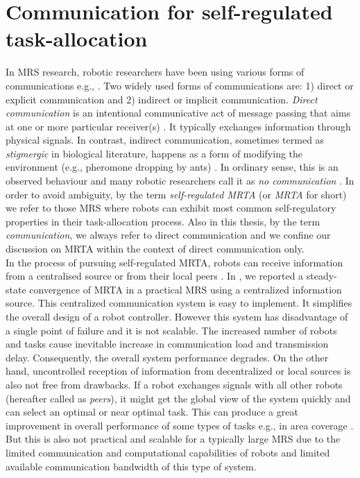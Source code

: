 \section{Communication for self-regulated task-allocation}
In MRS research, robotic researchers have been using various forms of communications e.g., \cite{Bonabeau+1999,Labella2007}. Two widely used forms of communications are: 1) direct or explicit communication and 2) indirect or implicit communication. {\em Direct communication} is an intentional communicative act of message passing that aims at one or more particular receiver(s) \cite{Mataric1998}. It typically exchanges information through physical signals. In contrast, indirect communication, sometimes termed as {\em stigmergic} in biological literature, happens as a form of modifying the environment (e.g., pheromone dropping by ants) \cite{Bonabeau+1999}. In ordinary sense, this is an observed behaviour and many robotic researchers call it as {\em no communication} \cite{Labella2007}. In order to avoid ambiguity, by the term {\em self-regulated MRTA} (or {\em MRTA} for short) we refer to those MRS where robots can exhibit most common self-regulatory properties \cite{Bonabeau+1999} in their task-allocation process. Also in this thesis, by the term {\em communication}, we always refer to direct communication and we confine our discussion on MRTA within the context of direct communication only.\\
%
In the process of pursuing self-regulated MRTA, robots can receive information from a centralised source \cite{Krieger+2000} or from their local peers \cite{Agassounon+2004}. In \cite{Sarker+2010robotic}, we reported a steady-state convergence of MRTA in a practical MRS using a centralized information source. This centralized communication system is easy to implement. It simplifies the overall design of a robot controller. However this system has disadvantage of a single point of failure and it is not scalable. The increased number of robots and tasks cause inevitable increase in communication load and transmission delay. Consequently, the overall system performance degrades. On the other hand, uncontrolled reception of information from decentralized or local sources is also not free from drawbacks. If a robot exchanges signals with all other robots (hereafter called as {\em peers}), it might get the global view of the system quickly and can select an optimal or near optimal task. This can produce a great improvement in overall performance of some types of tasks e.g., in area coverage \cite{Rutishauser+2009}. But this is also not practical and scalable for a typically large MRS due to the limited communication and computational capabilities of robots and limited available communication bandwidth of this type of system.\\
